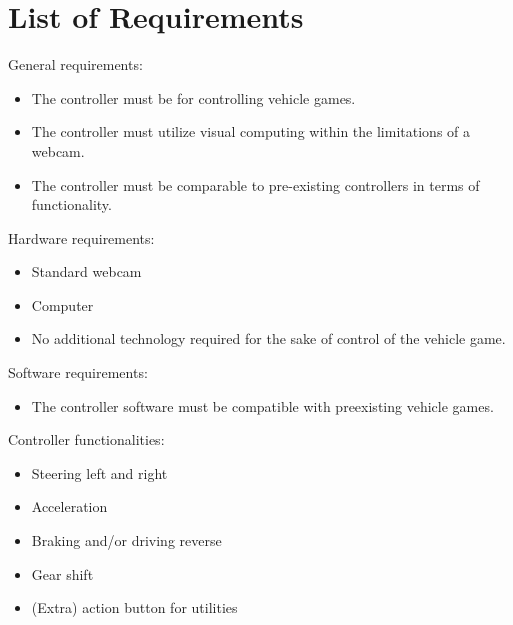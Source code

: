 \section{List of Requirements}
General requirements:
\begin{itemize}
\item The controller must be for controlling vehicle games.
\item The controller must utilize visual computing within the limitations of a webcam.
\item The controller must be comparable to pre-existing controllers in terms of functionality.
\end{itemize}
Hardware requirements:
\begin{itemize}
\item Standard webcam
\item Computer
\item No additional technology required for the sake of control of the vehicle game.
\end{itemize}
Software requirements:
\begin{itemize}
\item The controller software must be compatible with preexisting vehicle games.
\end{itemize}
Controller functionalities:
\begin{itemize}
\item Steering left and right
\item Acceleration
\item Braking and/or driving reverse
\item Gear shift
\item (Extra) action button for utilities 
\end{itemize}